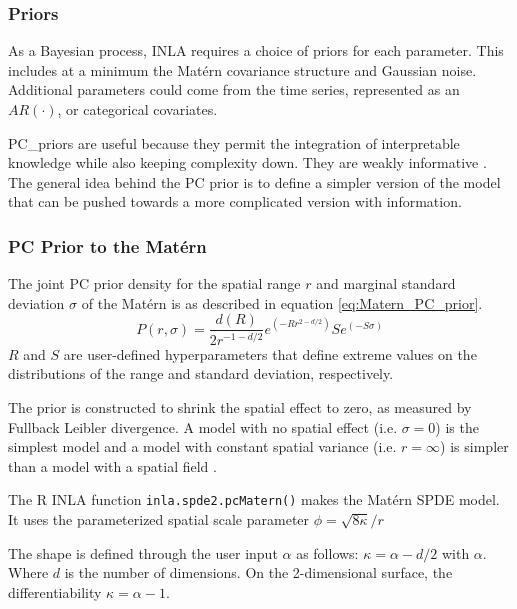\documentclass{article}
\begin{document}
\subsubsection*{Priors} \label{subsubsec:Priors}
As a Bayesian process, \ac{INLA} requires a choice of priors for each parameter.  This includes at a minimum the  Mat\'{e}rn covariance structure and Gaussian noise.  Additional parameters could come from the time series, represented as an $AR(\cdot)$, or categorical covariates.

\Gls{PC_priors} are useful because they permit the integration of interpretable knowledge while also keeping complexity down.  They are weakly informative  \citep{fuglstad2017constructing, simpson2017penalising}.
The general idea behind the PC prior is to define a simpler version of the model that can be pushed towards a more complicated version with information.   


\subsubsection*{PC Prior to the Mat\'{e}rn}
\label{subsubsec:pcprioronmatern}
The joint PC prior density for the spatial range $r$ and marginal standard deviation $\sigma$ of the Mat\'{e}rn is as described in equation \ref{eq:Matern_PC_prior}.
\begin{equation} \label{eq:Matern_PC_prior}
	P(r, \sigma) = \frac{d(R)}{2 r^{-1-d/2}} e^{(-R r  ^{2 -d/2})} S e^{(-S \sigma)}
\end{equation}
$R$ and $S$ are user-defined hyperparameters that define extreme values on the distributions of the range and standard deviation, respectively.

The prior is constructed to shrink the spatial effect to zero, as measured by Fullback Leibler divergence.  A model with no spatial effect (i.e. $\sigma = 0$) is the simplest model and a model with constant spatial variance (i.e. $r = \infty$)  is simpler than a model with a spatial field \citep{fuglstad2017constructing}.

The R \ac{INLA} function \verb|inla.spde2.pcMatern()| makes the Mat\'{e}rn \ac{SPDE} model.  It uses the parameterized spatial scale parameter $\phi = \sqrt{8\kappa}/r$


The shape is defined through the user input $\alpha$ as follows:  $\kappa = \alpha -d/2$ with $\alpha$.  Where $d$ is the number of dimensions.  On the 2-dimensional surface, the differentiability $\kappa = \alpha -1$.


\end{document}
